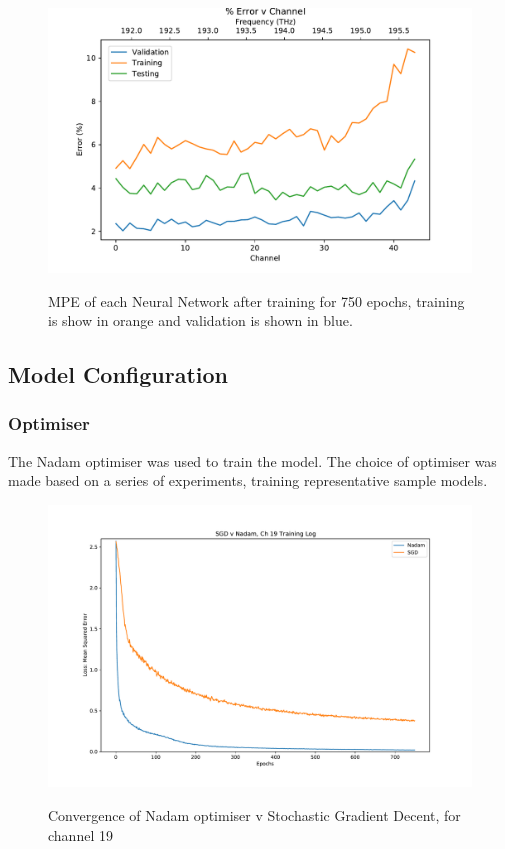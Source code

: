 
\begin{figure}
    \centering
    \caption{MPE of each Neural Network after training for 750 epochs, training is show in orange and validation is shown in blue.}
    \includegraphics[width=\textwidth]{project/img/ml_model/discrete/percent_error.pdf}
    \label{fig:ml_model:disc_train_val}
\end{figure}

\FloatBarrier
\subsection{Model Configuration}

\FloatBarrier
\subsubsection{Optimiser}
The Nadam optimiser was used to train the model. The choice of optimiser was made based on a series of experiments, training representative sample models.  
\begin{figure}
    \centering
    \caption{Convergence of Nadam optimiser v Stochastic Gradient Decent, for channel 19}
    \includegraphics[width=\textwidth]{project/img/ml_model/discrete/SGD v Nadam, Ch 19 Training Log.pdf}
    \label{fig:ml_model:sgd_nadam}
\end{figure}

